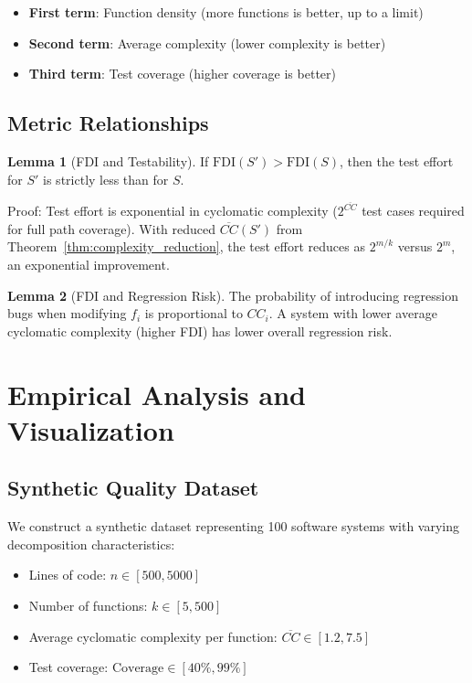 \documentclass[a4paper,12pt]{article}
\theoremstyle{definition}
\newtheorem{lemma}{Lemma}
\begin{document}
\begin{itemize}
	\item \textbf{First term}: Function density (more functions is better, up to a limit)
	\item \textbf{Second term}: Average complexity (lower complexity is better)
	\item \textbf{Third term}: Test coverage (higher coverage is better)
\end{itemize}

\subsection{Metric Relationships}

\begin{lemma}[FDI and Testability]
If $\mathrm{FDI}(S') > \mathrm{FDI}(S)$, then the test effort for $S'$ is strictly less than for $S$.

Proof: Test effort is exponential in cyclomatic complexity ($2^{\overline{CC}}$ test cases required for full path coverage). With reduced $\overline{CC}(S')$ from Theorem~\ref{thm:complexity_reduction}, the test effort reduces as $2^{m/k}$ versus $2^m$, an exponential improvement. \qedhere
\end{lemma}

\begin{lemma}[FDI and Regression Risk]
The probability of introducing regression bugs when modifying $f_i$ is proportional to $CC_i$. A system with lower average cyclomatic complexity (higher FDI) has lower overall regression risk. \qedhere
\end{lemma}

\section{Empirical Analysis and Visualization}

\subsection{Synthetic Quality Dataset}

We construct a synthetic dataset representing 100 software systems with varying decomposition characteristics:

\begin{itemize}
	\item Lines of code: $n \in [500, 5000]$
	\item Number of functions: $k \in [5, 500]$
	\item Average cyclomatic complexity per function: $\overline{CC} \in [1.2, 7.5]$
	\item Test coverage: $\text{Coverage} \in [40\%, 99\%]$
\end{itemize}
\end{document}

